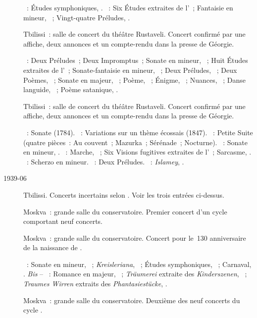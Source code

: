 \begin{description}
 \textsc{\Schumann{}}~: Études symphoniques, .
 \textsc{\Chopin{}}~: Six Études extraites de l'~; Fantaisie en \kF
 mineur, ~; Vingt-quatre Préludes, .
 \item[\DateWithWeekDay{1939-05-30}]
 Tbilissi~: salle de concert du théâtre Rustaveli.
 Concert confirmé par une affiche, deux annonces et un compte-rendu dans la
 presse de Géorgie.

 \textsc{\Scriabine{}}~: Deux Préludes~; Deux Impromptus~; Sonate en \kF
 \Sharp mineur, ~; Huit Études extraites de l'~;
 Sonate-fantaisie en \kG \Sharp mineur, ~; Deux Préludes,
 ~; Deux Poèmes, ~; Sonate en \kF \Sharp majeur,
 ~; Poème,  ~; Énigme,  ~;
 Nuances,  ~; Danse languide,  ~;
 Poème satanique, .
 \item[\DateWithWeekDay{1939-06-01}]
 Tbilissi~: salle de concert du théâtre Rustaveli.
 Concert confirmé par une affiche, deux annonces et un compte-rendu dans la
 presse de Géorgie.

 \textsc{\Bortnianski{}}~: Sonate (1784).
 \textsc{\Glinka{}}~: Variations sur un thème écossais (1847).
 \textsc{\Borodine{}}~: Petite Suite (quatre pièces~: Au couvent~; Mazurka~;
 Sérénade~; Nocturne).
 \textsc{\Glazounov{}}~: Sonate en \kB \Flat mineur, .
 \textsc{\Prokofiev{}}~: Marche,  ~; Six Visions
 fugitives extraites de l'~; Sarcasme,  .
 \textsc{\Goltz{}}~: Scherzo en \kE mineur.
 \textsc{\Rachmaninov{}}~: Deux Préludes.
 \textsc{\Balakirev{}}~: \emph{Islamey}, .
 \item[1939-06]
 Tbilissi.
 Concerts incertains selon \citet[p.~414]{Scriabine}.
 Voir les trois entrées ci-dessus.
 \item[\DateWithWeekDay{1939-09-15}]
 Moskva~: grande salle du conservatoire.
 Premier concert d'un cycle \Chopin{} comportant neuf concerts.
 \item[\DateWithWeekDay{1939-10-09}]
 Moskva~: grande salle du conservatoire.
 Concert pour le~130\ieme{} anniversaire de la naissance de \Schumann{}.

 \textsc{\Schumann{}}~: Sonate en \kF mineur, ~;
 \emph{Kreisleriana}, ~; Études symphoniques, ~; Carnaval,
 .
 \emph{Bis} -- \textsc{\Schumann{}}~: Romance en \kF \Sharp majeur,
  ~; \emph{Träumerei} extraite des \emph{Kinderszenen},
 ~; \emph{Traumes Wirren} extraits des \emph{Phantasiestücke},
  .
 \item[\DateWithWeekDay{1939-10-15}]
 Moskva~: grande salle du conservatoire.
 Deuxième des neuf concerts du cycle \Chopin{}.


\end{description}

